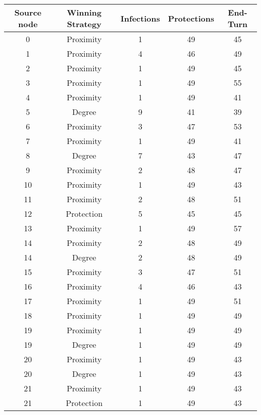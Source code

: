 \documentclass[results.tex]{subfiles}
\begin{document}
\begin{center}
  \begin{tabular}{| c || c | c | c | c |}
    \hline
    {\bfseries Source node} & {\bfseries Winning Strategy} & {\bfseries Infections} & {\bfseries Protections} & {\bfseries End-Turn} \\  %
    \hline\hline
    0 & Proximity & 1 & 49 & 45 \\ 
    \hline
    1 & Proximity & 4 & 46 & 49 \\ 
    \hline
    2 & Proximity & 1 & 49 & 45 \\ 
    \hline
    3 & Proximity & 1 & 49 & 55 \\ 
    \hline
    4 & Proximity & 1 & 49 & 41 \\ 
    \hline
    5 & Degree & 9 & 41 & 39 \\ 
    \hline
    6 & Proximity & 3 & 47 & 53 \\ 
    \hline
    7 & Proximity & 1 & 49 & 41 \\ 
    \hline
    8 & Degree & 7 & 43 & 47 \\ 
    \hline
    9 & Proximity & 2 & 48 & 47 \\ 
    \hline
    10 & Proximity & 1 & 49 & 43 \\ 
    \hline
    11 & Proximity & 2 & 48 & 51 \\ 
    \hline
    12 & Protection & 5 & 45 & 45 \\ 
    \hline
    13 & Proximity & 1 & 49 & 57 \\ 
    \hline
    14 & Proximity & 2 & 48 & 49 \\ 
    \hline
    14 & Degree & 2 & 48 & 49 \\ 
    \hline
    15 & Proximity & 3 & 47 & 51 \\ 
    \hline
    16 & Proximity & 4 & 46 & 43 \\ 
    \hline
    17 & Proximity & 1 & 49 & 51 \\ 
    \hline
    18 & Proximity & 1 & 49 & 49 \\ 
    \hline
    19 & Proximity & 1 & 49 & 49 \\ 
    \hline
    19 & Degree & 1 & 49 & 49 \\ 
    \hline
    20 & Proximity & 1 & 49 & 43 \\ 
    \hline
    20 & Degree & 1 & 49 & 43 \\ 
    \hline
    21 & Proximity & 1 & 49 & 43 \\ 
    \hline
    21 & Protection & 1 & 49 & 43 \\ 

\end{tabular}
\end{center}
\end{document}
